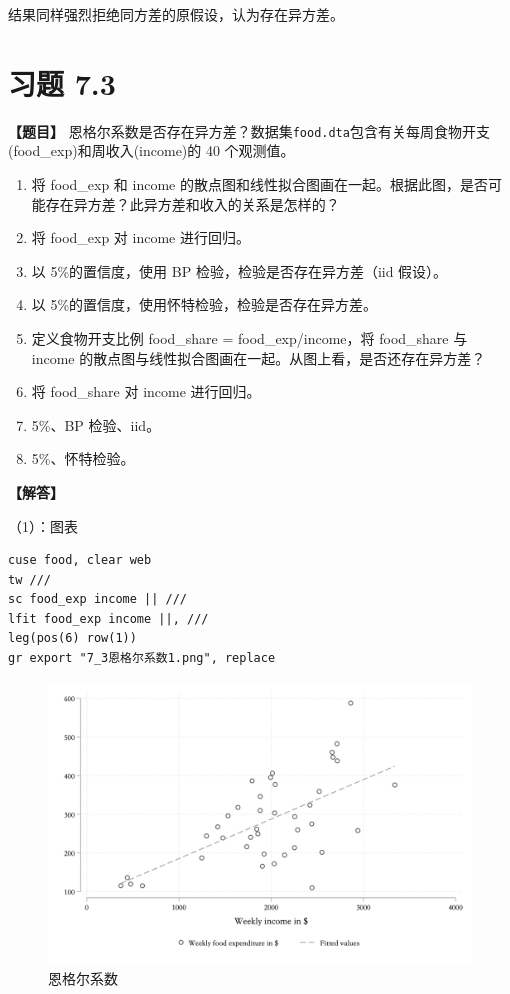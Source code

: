\documentclass[cn,fancy,blue,11pt]{elegantbook}
\begin{document}
结果同样强烈拒绝同方差的原假设，认为存在异方差。

\hypertarget{section-47}{%
\section{习题 7.3}\label{section-47}}

\textbf{【题目】}
恩格尔系数是否存在异方差？数据集\lstinline{food.dta}包含有关每周食物开支(food\_exp)和周收入(income)的 40 个观测值。

\begin{enumerate}
  \item 将 food\_exp 和 income 的散点图和线性拟合图画在一起。根据此图，是否可能存在异方差？此异方差和收入的关系是怎样的？
  \item 将 food\_exp 对 income 进行回归。
  \item 以 5\%的置信度，使用 BP 检验，检验是否存在异方差（iid 假设）。
  \item 以 5\%的置信度，使用怀特检验，检验是否存在异方差。
  \item 定义食物开支比例 food\_share = food\_exp/income，将 food\_share 与 income 的散点图与线性拟合图画在一起。从图上看，是否还存在异方差？
  \item 将 food\_share 对 income 进行回归。
  \item 5\%、BP 检验、iid。
  \item 5\%、怀特检验。
\end{enumerate}

\textbf{【解答】}

（1）：图表

\begin{lstlisting}
cuse food, clear web
tw ///
sc food_exp income || ///
lfit food_exp income ||, ///
leg(pos(6) row(1))
gr export "7_3恩格尔系数1.png", replace
\end{lstlisting}

\begin{figure}

{\centering \includegraphics[width=0.9\linewidth]{assets/7_3恩格尔系数1}

}

\caption{恩格尔系数}\label{fig:pic73}
\end{figure}
\end{document}
